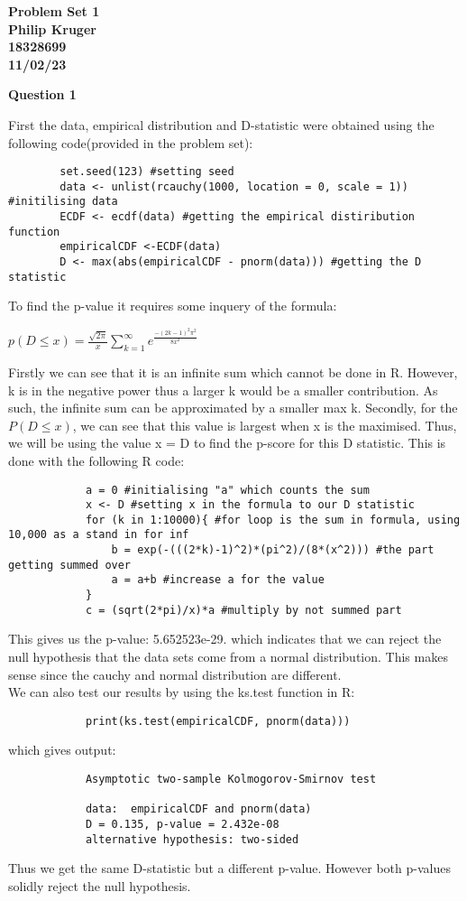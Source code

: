 \documentclass{article}
\begin{document}
	
	\begin{center}
		\textbf{
			{\LARGE Problem Set 1}\\
			Philip Kruger\\
			18328699\\
			11/02/23\\
		}
	\end{center}
	\vspace{10mm}
	\textbf{\Large Question 1\\}
	
	First the data, empirical distribution and D-statistic were obtained using the following code(provided in the problem set):
	\begin{verbatim}
		set.seed(123) #setting seed
		data <- unlist(rcauchy(1000, location = 0, scale = 1)) #initilising data
		ECDF <- ecdf(data) #getting the empirical distiribution function
		empiricalCDF <-ECDF(data)
		D <- max(abs(empiricalCDF - pnorm(data))) #getting the D statistic
	\end{verbatim}
	To find the p-value it requires some inquery of the formula:
	\begin{center}
		$p(D \leq x) = \frac{\sqrt{2\pi}}{x}\sum_{k=1}^{\infty} e^{\frac{-(2k-1)^2 \pi^2}{8x^2}}$
		\end{center}
		Firstly we can see that it is an infinite sum which cannot be done in R. However, k is in the negative power thus a larger k would be a smaller contribution. As such, the infinite sum can be approximated by a smaller max k. Secondly, for the $P(D \leq x)$, we can see that this value is largest when x is the maximised. Thus, we will be using the value x = D to find the p-score for this D statistic. This is done with the following R code:
		\begin{verbatim}
			a = 0 #initialising "a" which counts the sum
			x <- D #setting x in the formula to our D statistic
			for (k in 1:10000){ #for loop is the sum in formula, using 10,000 as a stand in for inf
				b = exp(-(((2*k)-1)^2)*(pi^2)/(8*(x^2))) #the part getting summed over
				a = a+b #increase a for the value
			}
			c = (sqrt(2*pi)/x)*a #multiply by not summed part
		\end{verbatim}
		This gives us the p-value: 5.652523e-29.
		which indicates that we can reject the null hypothesis that the data sets come from a normal distribution. This makes sense since the cauchy and normal distribution are different.\\
		We can also test our results by using the ks.test function in R: 
		\begin{verbatim}
			print(ks.test(empiricalCDF, pnorm(data)))
		\end{verbatim}
		which gives output:
		\begin{verbatim}
			Asymptotic two-sample Kolmogorov-Smirnov test
			
			data:  empiricalCDF and pnorm(data)
			D = 0.135, p-value = 2.432e-08
			alternative hypothesis: two-sided
		\end{verbatim}
		Thus we get the same D-statistic but a different p-value. However both p-values solidly reject the null hypothesis.\\
		\clearpage
		
\end{document}

